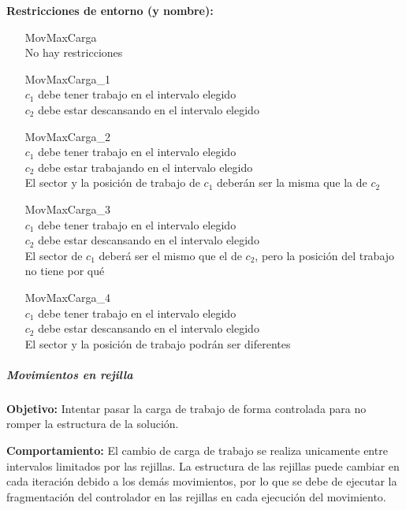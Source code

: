 \textbf{Restricciones de entorno (y nombre):}
\begin{enumerate}[align=parleft, labelsep=2cm, itemindent=5em, font=\itshape]
	\item[MovMaxCarga]\mbox{}\\No hay restricciones
	
	\item[MovMaxCarga\_1]\mbox{}\\
	$c_1$ debe tener trabajo en el intervalo elegido \\ 
	$c_2$ debe estar descansando en el intervalo elegido
	
	\item[MovMaxCarga\_2]\mbox{}\\
	$c_1$ debe tener trabajo en el intervalo elegido \\ 
	$c_2$ debe estar trabajando en el intervalo elegido \\
	El sector y la posición de trabajo de $c_1$ deberán ser la misma que la de $c_2$
	
	\item[MovMaxCarga\_3]\mbox{}\\
	$c_1$ debe tener trabajo en el intervalo elegido \\ 
	$c_2$ debe estar descansando en el intervalo elegido \\
	El sector de $c_1$ deberá ser el mismo que el de $c_2$, pero la posición del trabajo no tiene por qué
	
	\item[MovMaxCarga\_4]\mbox{}\\
	$c_1$ debe tener trabajo en el intervalo elegido \\ 
	$c_2$ debe estar descansando en el intervalo elegido \\
	El sector y la posición de trabajo podrán ser diferentes 
\end{enumerate}

\subparagraph{Movimientos en rejilla}
\label{entorno:movRejilla}

\textbf{Objetivo:} Intentar pasar la carga de trabajo de forma controlada para no romper la estructura de la solución.

\textbf{Comportamiento:} El cambio de carga de trabajo se realiza unicamente entre intervalos limitados por las rejillas. La estructura de las rejillas puede cambiar en cada iteración debido a los demás movimientos, por lo que se debe de ejecutar la fragmentación del controlador en las rejillas en cada ejecución del movimiento.

